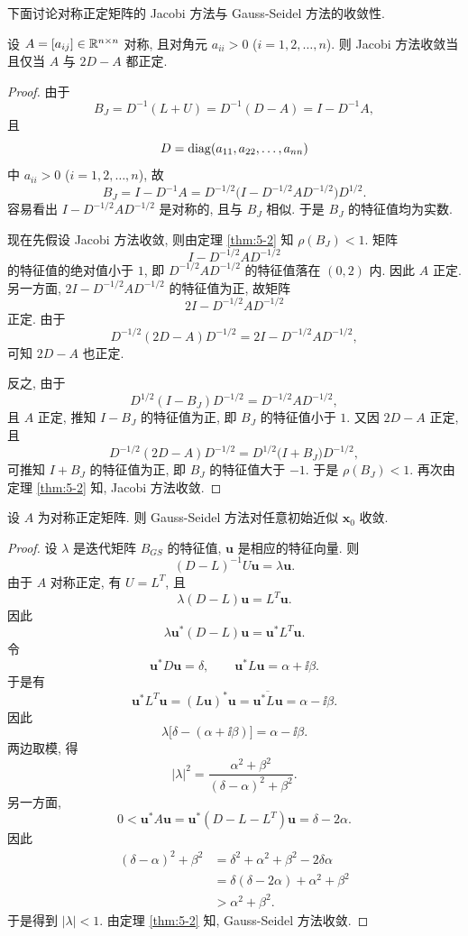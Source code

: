 下面讨论对称正定矩阵的 Jacobi 方法与 Gauss-Seidel 方法的收敛性.

\begin{theorem}
\label{thm:5-5}
设 $A=[a_{ij}]\in\mathbb{R}^{n\times n}$ 对称, 且对角元 $a_{ii}>0$ ($i=1,2,\ldots,n$). 则 Jacobi 方法收敛当且仅当 $A$ 与 $2D-A$ 都正定.
\end{theorem}

\begin{proof}
由于
\[
  B_J=D^{-1}(L+U)=D^{-1}(D-A)=I-D^{-1}A,
\]
且
\[
  D=\operatorname{diag}(a_{11},a_{22},\ldots,a_{nn})
\]
中 $a_{ii}>0$ ($i=1,2,\ldots,n$), 故
\[
  B_J=I-D^{-1}A=D^{-1/2}\bigl(I-D^{-1/2}AD^{-1/2}\bigr)D^{1/2}.
\]
容易看出 $I-D^{-1/2}AD^{-1/2}$ 是对称的, 且与 $B_J$ 相似. 于是 $B_J$ 的特征值均为实数.

现在先假设 Jacobi 方法收敛, 则由定理 \ref{thm:5-2} 知 $\rho(B_J)<1$. 矩阵
\[
  I-D^{-1/2}AD^{-1/2}
\]
的特征值的绝对值小于 $1$, 即 $D^{-1/2}AD^{-1/2}$ 的特征值落在 $(0,2)$ 内. 因此 $A$ 正定. 另一方面, $2I-D^{-1/2}AD^{-1/2}$ 的特征值为正, 故矩阵
\[
  2I-D^{-1/2}AD^{-1/2}
\]
正定. 由于
\[
  D^{-1/2}(2D-A)D^{-1/2}=2I-D^{-1/2}AD^{-1/2},
\]
可知 $2D-A$ 也正定.

反之, 由于
\[
  D^{1/2}(I-B_J)D^{-1/2}=D^{-1/2}AD^{-1/2},
\]
且 $A$ 正定, 推知 $I-B_J$ 的特征值为正, 即 $B_J$ 的特征值小于 $1$. 又因 $2D-A$ 正定, 且
\[
  D^{-1/2}(2D-A)D^{-1/2}=D^{1/2}\bigl(I+B_J\bigr)D^{-1/2},
\]
可推知 $I+B_J$ 的特征值为正, 即 $B_J$ 的特征值大于 $-1$. 于是 $\rho(B_J)<1$. 再次由定理 \ref{thm:5-2} 知, Jacobi 方法收敛.
\end{proof}

\begin{theorem}
\label{thm:5-6}
设 $A$ 为对称正定矩阵. 则 Gauss-Seidel 方法对任意初始近似 $\mathbf{x}_0$ 收敛.
\end{theorem}

\begin{proof}
设 $\lambda$ 是迭代矩阵 $B_{GS}$ 的特征值, $\mathbf{u}$ 是相应的特征向量. 则
\[
  (D-L)^{-1}U\mathbf{u}=\lambda\mathbf{u}.
\]
由于 $A$ 对称正定, 有 $U=L^T$, 且
\[
  \lambda(D-L)\mathbf{u}=L^T\mathbf{u}.
\]
因此
\[
  \lambda\mathbf{u}^*(D-L)\mathbf{u}=\mathbf{u}^*L^T\mathbf{u}.
\]
令
\[
  \mathbf{u}^*D\mathbf{u}=\delta,\qquad \mathbf{u}^*L\mathbf{u}=\alpha+\ii\beta.
\]
于是有
\[
  \mathbf{u}^*L^T\mathbf{u}=(L\mathbf{u})^*\mathbf{u}=\overline{\mathbf{u}^*L\mathbf{u}}=\alpha-\ii\beta.
\]
因此
\[
  \lambda\bigl[\delta-(\alpha+\ii\beta)\bigr]=\alpha-\ii\beta.
\]
两边取模, 得
\[
  |\lambda|^2=\frac{\alpha^2+\beta^2}{(\delta-\alpha)^2+\beta^2}.
\]
另一方面,
\[
  0<\mathbf{u}^*A\mathbf{u}=\mathbf{u}^*(D-L-L^T)\mathbf{u}=\delta-2\alpha.
\]
因此
\[
  \begin{aligned}
    (\delta-\alpha)^2+\beta^2
    &=\delta^2+\alpha^2+\beta^2-2\delta\alpha\\
    &=\delta(\delta-2\alpha)+\alpha^2+\beta^2\\
    &>\alpha^2+\beta^2.
  \end{aligned}
\]
于是得到 $|\lambda|<1$. 由定理 \ref{thm:5-2} 知, Gauss-Seidel 方法收敛.
\end{proof}

